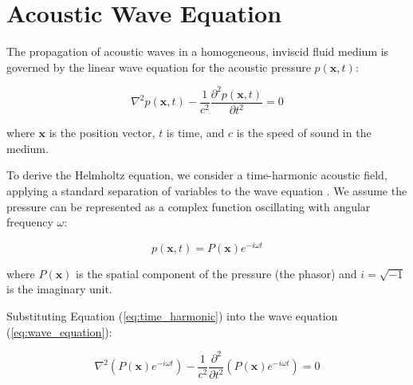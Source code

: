 \section{Acoustic Wave Equation}\label{sec:acoustic-helmholtz}

The propagation of acoustic waves in a homogeneous, inviscid fluid medium is governed by the linear wave equation for the acoustic pressure $p(\mathbf{x}, t)$:

\begin{equation}
    \nabla^2 p(\mathbf{x}, t) - \frac{1}{c^2} \frac{\partial^2 p(\mathbf{x}, t)}{\partial t^2} = 0
    \label{eq:wave_equation}
\end{equation}



where $\mathbf{x}$ is the position vector, $t$ is time, and $c$ is the speed of sound in the medium.




To derive the Helmholtz equation, we consider a time-harmonic acoustic field, applying a standard separation of variables to the wave equation \cite{arfkenmathematicalmethodsphysicists2005}. We assume the pressure can be represented as a complex function oscillating with angular frequency $\omega$:

\begin{equation}
    p(\mathbf{x}, t) = P(\mathbf{x}) e^{-i \omega t}
    \label{eq:time_harmonic}
\end{equation}

where $P(\mathbf{x})$ is the spatial component of the pressure (the phasor) and $i = \sqrt{-1}$ is the imaginary unit.

Substituting Equation (\ref{eq:time_harmonic}) into the wave equation (\ref{eq:wave_equation}):

\begin{equation}
    \nabla^2 \left( P(\mathbf{x}) e^{-i \omega t} \right) - \frac{1}{c^2} \frac{\partial^2}{\partial t^2} \left( P(\mathbf{x}) e^{-i \omega t} \right) = 0
\end{equation}

